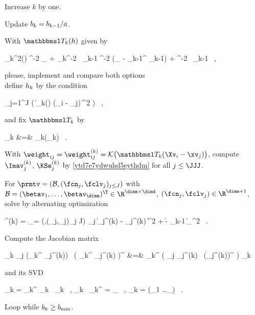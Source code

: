 \begin{mylist}
\item 
Increase \( k \) by one. 

\item
Update \( b_{k} = b_{k-1} / a \).

\item
With \( \TEDR_{k}(\hiso) \) given by
\begin{EQA}[c]
	\TEDR_{k}^{2}(\hiso)
	\eqdef
	\hiso^{-2} \Id_{\dimd} + \haniso_{k}^{-2} \, \JEDR_{k-1}
	\qquad
	\quad
	\hiso^{-2} (\Id_{\dimd} - \PEDR_{k-1}^{\T} \PEDR_{k-1}) + \haniso^{-2} \, \JEDR_{k-1}
	\, ,
\end{EQA}
{\color{blue} please, implement and compare both options}
\\
define \( h_{k} \) by the condition
\begin{EQA}[c]
	 \sum_{j=1}^{J} \sumi 
		\Kern\bigl( \| \TEDR_{k}(\hiso) \; (\Xv_{i} - \xv_{j}) \|^{2} \bigr)
	\geq 
	\nmin
	\, ,
\label{jhgiverkytde4w34etycjam}
\end{EQA}
and fix \( \TEDR_{k} \) by 
\begin{EQA}[rcl]
	\TEDR_{k}
	&=&
	\TEDR_{k}(\hiso_{k})
	\, .
\end{EQA}

\item 
With \( \weight_{ij} = \weight_{ij}^{(k)} = \Kern\bigl( \TEDR_{k} (\Xv_{i} - \xv_{j}) \bigr) \), compute
\( \Imav_{j}^{(k)} \), \( \KSe_{j}^{(k)} \) by \eqref{ytd7e7ydwuhd5eythdm} for all \( j \leq \JJJ \).

\item
For \( \prmtv = (\BEDR,(\fcn_{j},\fclv_{j})_{j \leq J}) \) with 
\( \BEDR = (\betav_{1}, \ldots, \betav_{\dimm})^{\T} \in \R^{\dimm \times \dimd} \), 
\( (\fcn_{j},\fclv_{j}) \in \R^{\dimm+1} \),
solve by alternating optimization
\begin{EQA}[c]
	\prmtv^{(k)}
	=
	\arginf_{\prmtv = (\BEDR,(\fcn_{j},\fclv_{j})_{j \leq J})}
	\sum_{j} \biggl\| \Imav_{j}^{(k)} - \KSe_{j}^{(k)}  \biggr\|^{2} 
	+ \lambda \| \BEDR - \PEDR_{k-1} \|_{\Fr}^{2}
	\, .
\end{EQA}


\item
Compute the Jacobian matrix
\begin{EQA}[rcl]
	\JEDR_{k}
	\eqdef
	\sum_{j} (\BEDR_{k}^{\T} {\fclv}_{j}^{(k)}) \, \bigl( \BEDR_{k}^{\T} {\fclv}_{j}^{(k)} \bigr)^{\T}
	&=&
	\BEDR_{k}^{\T} \Bigl( \sum_{j} {\fclv}_{j}^{(k)} \, ({\fclv}_{j}^{(k)})^{\T} \Bigr) \BEDR_{k}
\end{EQA}
and its SVD
\begin{EQA}[c]
	\JEDR_{k}
	=
	\PEDR_{k}^{\T} \Lambda_{k} \, \PEDR_{k}
	\, ,
	\qquad
	\PEDR_{k} \, \PEDR_{k}^{\T}
	= 
	\Id_{\dimm}
	\, ,
	\quad
	\Lambda_{k} = \diag(\lambda_{1} \geq \ldots \geq \lambda_{\dimm})
	\, .
\end{EQA}

\item
Loop while \( b_{k} \geq b_{\min} \).

\end{mylist}



